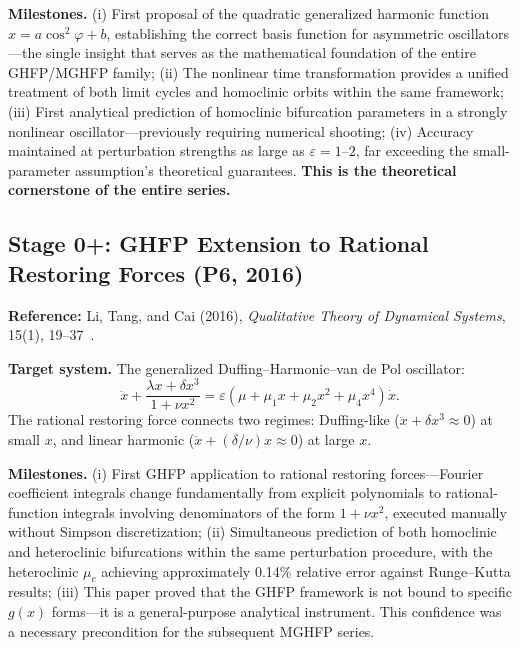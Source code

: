 \documentclass[11pt,a4paper]{article}
\begin{document}
\medskip
\noindent\textbf{Milestones.} (i) First proposal of the quadratic generalized harmonic function $x = a\cos^2\varphi + b$, establishing the correct basis function for asymmetric oscillators---the single insight that serves as the mathematical foundation of the entire GHFP/MGHFP family; (ii) The nonlinear time transformation provides a unified treatment of both limit cycles and homoclinic orbits within the same framework; (iii) First analytical prediction of homoclinic bifurcation parameters in a strongly nonlinear oscillator---previously requiring numerical shooting; (iv) Accuracy maintained at perturbation strengths as large as $\varepsilon = 1$--$2$, far exceeding the small-parameter assumption's theoretical guarantees. \textbf{This is the theoretical cornerstone of the entire series.}

\subsection{Stage 0+: GHFP Extension to Rational Restoring Forces (P6, 2016)}

\textbf{Reference:} Li, Tang, and Cai (2016), \textit{Qualitative Theory of Dynamical Systems}, 15(1), 19--37~\cite{P6}.

\medskip
\noindent\textbf{Target system.} The generalized Duffing--Harmonic--van de Pol oscillator:
\begin{equation}
\ddot{x} + \frac{\lambda x + \delta x^3}{1 + \nu x^2} = \varepsilon(\mu + \mu_1 x + \mu_2 x^2 + \mu_4 x^4)\dot{x}.
\label{eq:P6}
\end{equation}
The rational restoring force connects two regimes: Duffing-like ($\ddot{x} + \delta x^3 \approx 0$) at small $x$, and linear harmonic ($\ddot{x} + (\delta/\nu)x \approx 0$) at large $x$.

\medskip
\noindent\textbf{Milestones.} (i) First GHFP application to rational restoring forces---Fourier coefficient integrals change fundamentally from explicit polynomials to rational-function integrals involving denominators of the form $1 + \nu x^2$, executed manually without Simpson discretization; (ii) Simultaneous prediction of both homoclinic and heteroclinic bifurcations within the same perturbation procedure, with the heteroclinic $\mu_c$ achieving approximately 0.14\% relative error against Runge--Kutta results; (iii) This paper proved that the GHFP framework is not bound to specific $g(x)$ forms---it is a general-purpose analytical instrument. This confidence was a necessary precondition for the subsequent MGHFP series.
\end{document}
